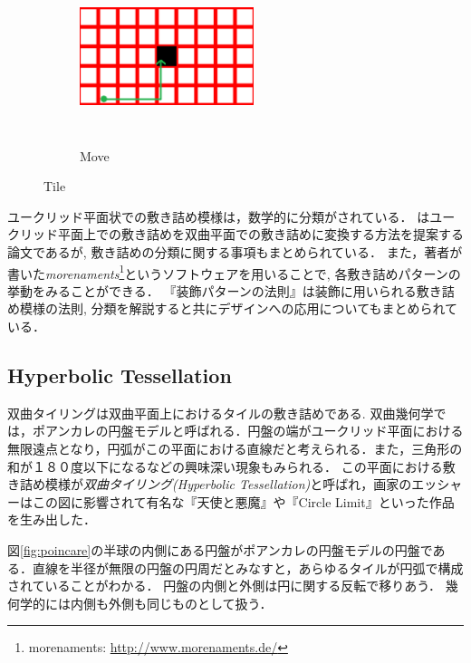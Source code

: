 \begin{figure}[h!tbp]
\begin{subfigure}{0.3\textwidth}
  \end{subfigure}
 \hspace*{\fill}
 \begin{subfigure}{0.3\textwidth}
  \begin{center}
   \includegraphics[width=2in, height=2in, keepaspectratio]{../img/tessellation/tileMove.pdf}
   \caption{Move}
   \label{fig:tileMove}
  \end{center}
 \end{subfigure}
 \hspace*{\fill}
\caption{Tile}
\end{figure}

ユークリッド平面状での敷き詰め模様は，数学的に分類がされている．
\cite{hyperbolization}はユークリッド平面上での敷き詰めを双曲平面での敷き詰めに変換する方法を提案する論文であるが, 敷き詰めの分類に関する事項もまとめられている．
また，著者が書いた\emph{morenaments}\footnote{morenaments: \url{http://www.morenaments.de/}}というソフトウェアを用いることで, 各敷き詰めパターンの挙動をみることができる．
『装飾パターンの法則』\cite{tessellationDesign}は装飾に用いられる敷き詰め模様の法則, 分類を解説すると共にデザインへの応用についてもまとめられている．

\subsection{Hyperbolic Tessellation}

双曲タイリングは双曲平面上におけるタイルの敷き詰めである. 
双曲幾何学では，ポアンカレの円盤モデルと呼ばれる．円盤の端がユークリッド平面における無限遠点となり，円弧がこの平面における直線だと考えられる．また，三角形の和が１８０度以下になるなどの興味深い現象もみられる．
この平面における敷き詰め模様が\emph{双曲タイリング}{\it (Hyperbolic Tessellation)}と呼ばれ，画家のエッシャーはこの図に影響されて有名な『天使と悪魔』や『Circle Limit』といった作品を生み出した．

図\ref{fig:poincare}の半球の内側にある円盤がポアンカレの円盤モデルの円盤である．直線を半径が無限の円盤の円周だとみなすと，あらゆるタイルが円弧で構成されていることがわかる．
円盤の内側と外側は円に関する反転で移りあう．
幾何学的には内側も外側も同じものとして扱う．

